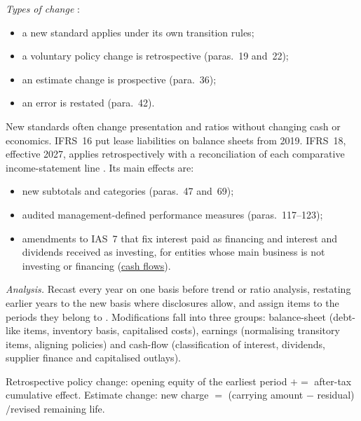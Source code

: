 \begin{qfmethod}\label{meth:accounting-change-effects}
 \emph{Types of change} \citep[IAS~8]{eu-2023-1803-ias8}:
\begin{itemize}
\item a new standard applies under its own transition rules;
\item a voluntary policy change is retrospective (paras.~19 and~22);
\item an estimate change is prospective (para.~36);
\item an error is restated (para.~42).
\end{itemize}
New standards often change presentation and ratios without changing cash or economics. IFRS~16 put lease liabilities on balance sheets from 2019. IFRS~18, effective 2027, applies retrospectively with a reconciliation of each comparative income-statement line \citep[Annex, IFRS~18 paras.~C1--C3]{eu-2026-338-ifrs18}. Its main effects are:
\begin{itemize}
\item new subtotals and categories (paras.~47 and~69);
\item audited management-defined performance measures (paras.~117--123);
\item amendments to IAS~7 that fix interest paid as financing and interest and dividends received as investing, for entities whose main business is not investing or financing (\hyperref[meth:statement-linked-cash-flows]{cash flows}).
\end{itemize}

\emph{Analysis.} Recast every year on one basis before trend or ratio analysis, restating earlier years to the new basis where disclosures allow, and assign items to the periods they belong to \citep[p.~603]{financial-statement-analysis-2009}. Modifications fall into three groups: balance-sheet (debt-like items, inventory basis, capitalised costs), earnings (normalising transitory items, aligning policies) and cash-flow (classification of interest, dividends, supplier finance and capitalised outlays).

 Retrospective policy change: opening equity of the earliest period $\mathrel{+}=$ after-tax cumulative effect. Estimate change: new charge $=$ (carrying amount $-$ residual)$/$revised remaining life.


\end{qfmethod}
